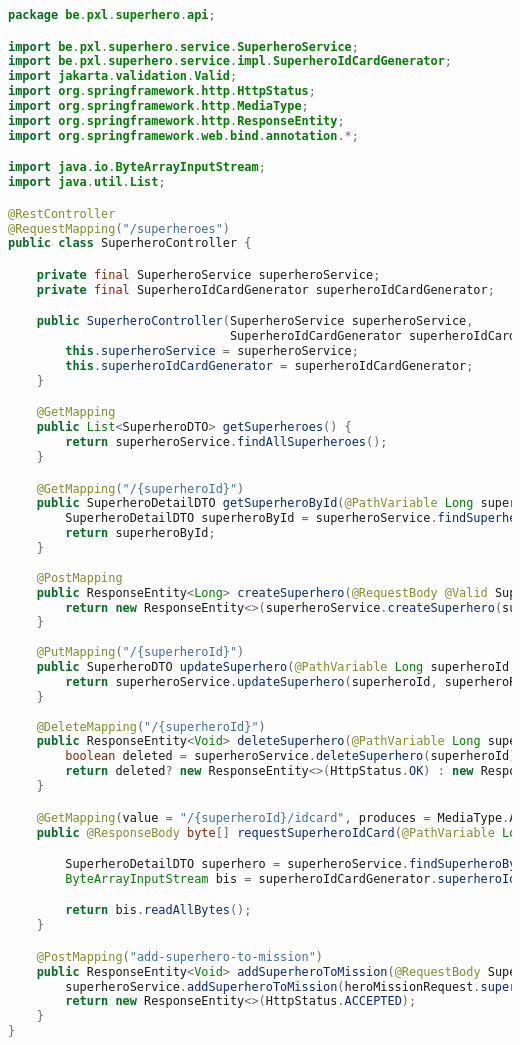 \begin{lstlisting}[language=java, frame=single]
package be.pxl.superhero.api;

import be.pxl.superhero.service.SuperheroService;
import be.pxl.superhero.service.impl.SuperheroIdCardGenerator;
import jakarta.validation.Valid;
import org.springframework.http.HttpStatus;
import org.springframework.http.MediaType;
import org.springframework.http.ResponseEntity;
import org.springframework.web.bind.annotation.*;

import java.io.ByteArrayInputStream;
import java.util.List;

@RestController
@RequestMapping("/superheroes")
public class SuperheroController {

	private final SuperheroService superheroService;
	private final SuperheroIdCardGenerator superheroIdCardGenerator;

	public SuperheroController(SuperheroService superheroService,
							   SuperheroIdCardGenerator superheroIdCardGenerator) {
		this.superheroService = superheroService;
		this.superheroIdCardGenerator = superheroIdCardGenerator;
	}

	@GetMapping
	public List<SuperheroDTO> getSuperheroes() {
		return superheroService.findAllSuperheroes();
	}

	@GetMapping("/{superheroId}")
	public SuperheroDetailDTO getSuperheroById(@PathVariable Long superheroId) {
		SuperheroDetailDTO superheroById = superheroService.findSuperheroById(superheroId);
		return superheroById;
	}
	
	@PostMapping
	public ResponseEntity<Long> createSuperhero(@RequestBody @Valid SuperheroRequest superheroRequest) {
		return new ResponseEntity<>(superheroService.createSuperhero(superheroRequest), HttpStatus.CREATED);
	}
	
	@PutMapping("/{superheroId}")
	public SuperheroDTO updateSuperhero(@PathVariable Long superheroId, @RequestBody @Valid SuperheroRequest superheroRequest) {
		return superheroService.updateSuperhero(superheroId, superheroRequest);
	}
	
	@DeleteMapping("/{superheroId}")
	public ResponseEntity<Void> deleteSuperhero(@PathVariable Long superheroId) {
		boolean deleted = superheroService.deleteSuperhero(superheroId);
		return deleted? new ResponseEntity<>(HttpStatus.OK) : new ResponseEntity<>(HttpStatus.BAD_REQUEST);
	}

	@GetMapping(value = "/{superheroId}/idcard", produces = MediaType.APPLICATION_PDF_VALUE)
	public @ResponseBody byte[] requestSuperheroIdCard(@PathVariable Long superheroId) {

		SuperheroDetailDTO superhero = superheroService.findSuperheroById(superheroId);
		ByteArrayInputStream bis = superheroIdCardGenerator.superheroIdCard(superhero);

		return bis.readAllBytes();
	}

	@PostMapping("add-superhero-to-mission")
	public ResponseEntity<Void> addSuperheroToMission(@RequestBody SuperheroMissionRequest heroMissionRequest) {
		superheroService.addSuperheroToMission(heroMissionRequest.superheroId(), heroMissionRequest.missionId());
		return new ResponseEntity<>(HttpStatus.ACCEPTED);
	}
}
\end{lstlisting}

